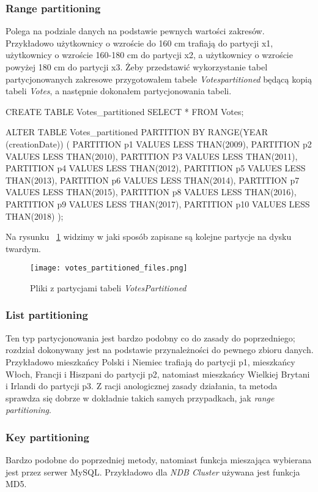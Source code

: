 \subsubsection{Range partitioning}
Polega na podziale danych na podstawie pewnych wartości zakresów. Przykładowo użytkownicy o wzroście do 160 cm trafiają do partycji x1, użytkownicy o wzroście 160-180 cm do partycji x2, a użytkownicy o wzroście powyżej 180 cm do partycji x3.
Żeby przedstawić wykorzystanie tabel partycjonowanych zakresowe przygotowałem tabele \textit{Votes\textunderscore partitioned} będącą kopią tabeli \textit{Votes}, a następnie dokonałem partycjonowania tabeli.
\begin{spverbatim}
	CREATE TABLE Votes_partitioned SELECT * FROM Votes;
\end{spverbatim}
\begin{spverbatim}
	ALTER TABLE Votes_partitioned PARTITION BY RANGE(YEAR (creationDate)) (
	PARTITION p1 VALUES LESS THAN(2009),
	PARTITION p2 VALUES LESS THAN(2010),
	PARTITION P3 VALUES LESS THAN(2011),
	PARTITION p4 VALUES LESS THAN(2012),
	PARTITION p5 VALUES LESS THAN(2013),
	PARTITION p6 VALUES LESS THAN(2014),
	PARTITION p7 VALUES LESS THAN(2015),
	PARTITION p8 VALUES LESS THAN(2016),
	PARTITION p9 VALUES LESS THAN(2017),
	PARTITION p10 VALUES LESS THAN(2018)
	);
\end{spverbatim}
Na rysunku ~\ref{fig:votes_partitioned_files} widzimy w jaki sposób zapisane są kolejne partycje na dysku twardym.

\begin{figure}
	\caption{Pliki z partycjami tabeli \textit{Votes\textunderscore Partitioned}}
	\centering
	\texttt{[image: votes\_partitioned\_files.png]}
	\label{fig:votes_partitioned_files}
\end{figure}

\subsubsection{List partitioning}
Ten typ partycjonowania jest bardzo podobny co do zasady do poprzedniego; rozdział dokonywany jest na podstawie przynależności do pewnego zbioru danych. Przykładowo mieszkańcy Polski i Niemiec trafiają do partycji p1, mieszkańcy Włoch, Francji i Hiszpani do partycji p2, natomiast mieszkańcy Wielkiej Brytani i Irlandi do partycji p3. Z racji anologicznej zasady działania, ta metoda sprawdza się dobrze w dokładnie takich samych przypadkach, jak \textit{range partitioning}.
\subsubsection{Key partitioning}
Bardzo podobne do poprzedniej metody, natomiast funkcja mieszająca wybierana jest przez serwer MySQL. Przykładowo dla \textit{NDB Cluster} używana jest funkcja MD5.

